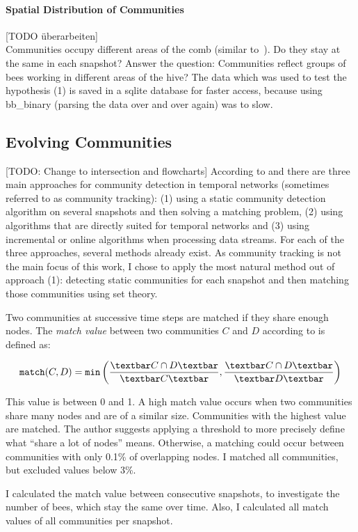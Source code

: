 \paragraph{Spatial Distribution of Communities}
[TODO überarbeiten]\\
Communities occupy different areas of the comb (similar to~\cite{baracchi2014socio}). Do they stay at the same in each snapshot?
Answer the question: Communities reflect groups of bees working in different areas of the hive? The data which was used to test the hypothesis (1) is saved in a sqlite database for faster access, because using bb\_binary (parsing the data over and over again) was to slow.\\

\subsection{Evolving Communities}
\label{sec:bg:tracking}
[TODO: Change to intersection and flowcharts]
According to \textcite{aynaud2013communities} and  \textcite{brodka2014community} there are three main approaches for community detection in temporal networks (sometimes referred to as community tracking): (1) using a static community detection algorithm on several snapshots and then solving a matching problem, (2) using algorithms that are directly suited for temporal networks and (3) using incremental or online algorithms when processing data streams. For each of the three approaches, several methods already exist.
As community tracking is not the main focus of this work, I chose to apply the most natural method out of approach (1): detecting static communities for each snapshot and then matching those communities using set theory.


Two communities at successive time steps are matched if they share enough nodes.
The \emph{match value} between two communities $C$ and $D$ according to \textcite{hopcroft2004tracking} is defined as:

\begin{equation}
\label{eq:match}
\texttt{match}(C,D) = \texttt{min}\left( \frac{\textbar C\cap D \textbar}{\textbar C\textbar }, \frac{\textbar C\cap D \textbar}{\textbar D \textbar }\right)
\end{equation}


This value is between 0 and 1. A high match value occurs when two communities share many nodes and are of a similar size. Communities with the highest value are matched. The author suggests applying a threshold to more precisely define what ``share a lot of nodes'' means. Otherwise, a matching could occur between communities with only 0.1\% of overlapping nodes. I matched all communities, but excluded values below 3\%.


I calculated the match value between consecutive snapshots, to investigate the number of bees, which stay the same over time. Also, I calculated all match values of all communities per snapshot.